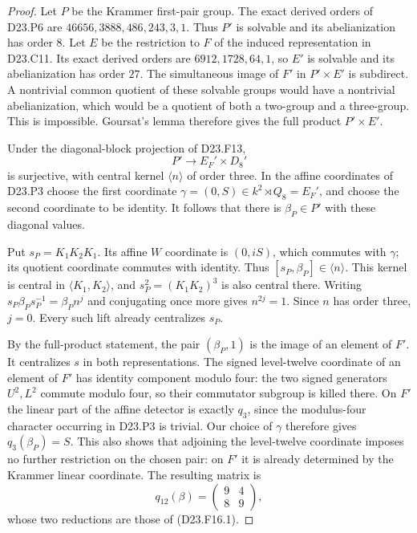 \begin{proof}
Let $P$ be the Krammer first-pair group.  The exact
derived orders of D23.P6 are
$46656,3888,486,243,3,1$. Thus $P'$ is solvable
and its abelianization has order $8$.
Let $E$ be the restriction to $F$ of the induced
representation in D23.C11. Its exact derived orders
are $6912,1728,64,1$, so $E'$ is solvable and its
abelianization has order $27$.
The simultaneous image of $F'$ in $P'\times E'$
is subdirect. A nontrivial common quotient of these
solvable groups would have a nontrivial abelianization,
which would be a quotient of both a two-group and
a three-group. This is impossible. Goursat's lemma
therefore gives the full product $P'\times E'$.

Under the diagonal-block projection of D23.F13,
\[
 P'\longrightarrow E_F'\times D_8'
\]
is surjective, with central kernel $\langle n\rangle$
of order three.  In the affine coordinates of D23.P3
choose the first coordinate
$\gamma=(0,S)\in k^2\rtimes Q_8=E_F'$,
and choose the second coordinate to be identity.
It follows that there is $\beta_P\in P'$ with
these diagonal values.

Put $s_P=K_1K_2K_1$. Its affine $W$ coordinate is
$(0,iS)$, which commutes with $\gamma$; its quotient
coordinate commutes with identity. Thus
$[s_P,\beta_P]\in\langle n\rangle$.
This kernel is central in $\langle K_1,K_2\rangle$,
and $s_P^2=(K_1K_2)^3$ is also central there.
Writing $s_P\beta_Ps_P^{-1}=\beta_Pn^j$ and
conjugating once more gives $n^{2j}=1$.
Since $n$ has order three, $j=0$. Every such lift
already centralizes $s_P$.

By the full-product statement, the pair
$(\beta_P,1)$ is the image of an element of $F'$.
It centralizes $s$ in both representations.  The
signed level-twelve coordinate of an element of
$F'$ has identity component modulo four: the two
signed generators $U^2,L^2$ commute modulo four,
so their commutator subgroup is killed there.
On $F'$ the linear part of the affine detector is
exactly $q_3$, since the modulus-four character
occurring in D23.P3 is trivial. Our choice of
$\gamma$ therefore gives $q_3(\beta_P)=S$.
This also shows that adjoining the level-twelve
coordinate imposes no further restriction on the
chosen pair: on $F'$ it is already determined by
the Krammer linear coordinate.  The resulting
matrix is
\[
 q_{12}(\beta)=\begin{pmatrix}9&4\\8&9\end{pmatrix},
\]
whose two reductions are those of (D23.F16.1).


\end{proof}
